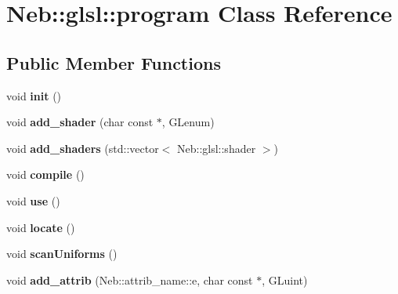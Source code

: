 \hypertarget{classNeb_1_1glsl_1_1program}{\section{\-Neb\-:\-:glsl\-:\-:program \-Class \-Reference}
\label{classNeb_1_1glsl_1_1program}
}
\subsection*{\-Public \-Member \-Functions}
\begin{DoxyCompactItemize}
\item 
\hypertarget{classNeb_1_1glsl_1_1program_a99ca8f6dd61152904e42afb7d1b459a3}{void {\bfseries init} ()}\label{classNeb_1_1glsl_1_1program_a99ca8f6dd61152904e42afb7d1b459a3}

\item 
\hypertarget{classNeb_1_1glsl_1_1program_a6cde9b2647b830ed62bb4bd34837d9fd}{void {\bfseries add\-\_\-shader} (char const $\ast$, \-G\-Lenum)}\label{classNeb_1_1glsl_1_1program_a6cde9b2647b830ed62bb4bd34837d9fd}

\item 
\hypertarget{classNeb_1_1glsl_1_1program_ac0d476bab79fceaab31b6bb44377aa6f}{void {\bfseries add\-\_\-shaders} (std\-::vector$<$ \-Neb\-::glsl\-::shader $>$)}\label{classNeb_1_1glsl_1_1program_ac0d476bab79fceaab31b6bb44377aa6f}

\item 
\hypertarget{classNeb_1_1glsl_1_1program_aee7d2cd7b292e8dcbd7ebcdc704bfe63}{void {\bfseries compile} ()}\label{classNeb_1_1glsl_1_1program_aee7d2cd7b292e8dcbd7ebcdc704bfe63}

\item 
\hypertarget{classNeb_1_1glsl_1_1program_af94447e84217b4d222c9bc0104ae3ec8}{void {\bfseries use} ()}\label{classNeb_1_1glsl_1_1program_af94447e84217b4d222c9bc0104ae3ec8}

\item 
\hypertarget{classNeb_1_1glsl_1_1program_a0b7490fa9a0396a052d7d37140a551ab}{void {\bfseries locate} ()}\label{classNeb_1_1glsl_1_1program_a0b7490fa9a0396a052d7d37140a551ab}

\item 
\hypertarget{classNeb_1_1glsl_1_1program_a861dd1120f2e6b68fbfadc48bfdb4832}{void {\bfseries scan\-Uniforms} ()}\label{classNeb_1_1glsl_1_1program_a861dd1120f2e6b68fbfadc48bfdb4832}

\item 
\hypertarget{classNeb_1_1glsl_1_1program_a8728bfb447c67e5078578a5c6a936493}{void {\bfseries add\-\_\-attrib} (\-Neb\-::attrib\-\_\-name\-::e, char const $\ast$, \-G\-Luint)}\label{classNeb_1_1glsl_1_1program_a8728bfb447c67e5078578a5c6a936493}


\end{DoxyCompactItemize}
